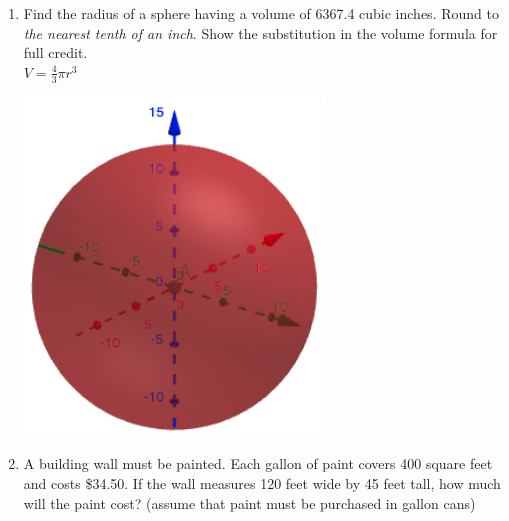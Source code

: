 \documentclass[12pt, twoside]{article}
\begin{document}
\begin{enumerate}
\newpage
\item Find the radius of a sphere having a volume of 6367.4 cubic inches. Round to \emph{the nearest tenth of an inch}. Show the substitution in the volume formula for full credit. \\[0.5cm]
$\displaystyle V = \frac{4}{3} \pi r^3$
  \begin{flushright}
    \includegraphics[width=8cm]{6-15-9-sphere.png}
  \end{flushright}

\newpage
\item A building wall must be painted. Each gallon of paint covers 400 square feet and costs \$34.50. If the wall measures 120 feet wide by 45 feet tall, how much will the paint cost? (assume that paint must be purchased in gallon cans)

\end{enumerate}
\end{document}
